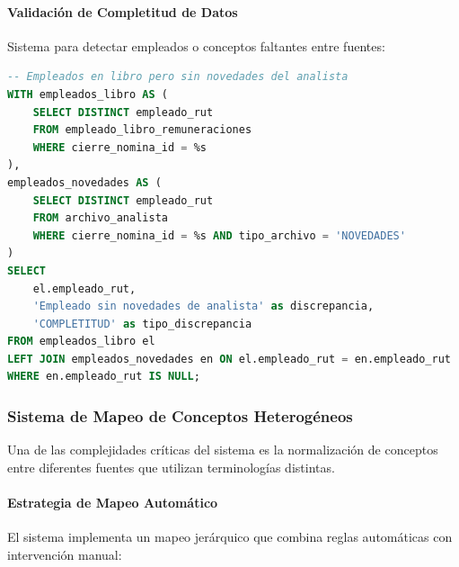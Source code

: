 \paragraph{Validación de Completitud de Datos}

Sistema para detectar empleados o conceptos faltantes entre fuentes:

\begin{lstlisting}[language=SQL, caption=Detección de Datos Faltantes]
-- Empleados en libro pero sin novedades del analista
WITH empleados_libro AS (
    SELECT DISTINCT empleado_rut 
    FROM empleado_libro_remuneraciones 
    WHERE cierre_nomina_id = %s
),
empleados_novedades AS (
    SELECT DISTINCT empleado_rut 
    FROM archivo_analista 
    WHERE cierre_nomina_id = %s AND tipo_archivo = 'NOVEDADES'
)
SELECT 
    el.empleado_rut,
    'Empleado sin novedades de analista' as discrepancia,
    'COMPLETITUD' as tipo_discrepancia
FROM empleados_libro el
LEFT JOIN empleados_novedades en ON el.empleado_rut = en.empleado_rut
WHERE en.empleado_rut IS NULL;
\end{lstlisting}

\subsubsection{Sistema de Mapeo de Conceptos Heterogéneos}

Una de las complejidades críticas del sistema es la normalización de conceptos entre diferentes fuentes que utilizan terminologías distintas.

\paragraph{Estrategia de Mapeo Automático}

El sistema implementa un mapeo jerárquico que combina reglas automáticas con intervención manual:

